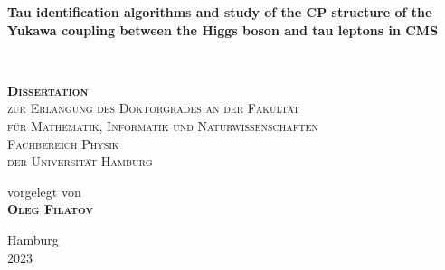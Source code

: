 
\begin{titlepage} %


\vspace{2cm}
    \centering

	\vspace{0.4cm}
    \parbox[t]{0.96\textwidth}{\rmfamily \setlength\parfillskip{0pt} \def\baselinestretch{1.1}\centering\Huge \bfseries Tau identification algorithms and study of the CP structure of the Yukawa coupling between the Higgs boson and tau leptons in CMS}\\
	\vspace{0.4cm}
    \vspace{2 cm} %
	
	
    \parbox[p]{0.95\textwidth}{\def\baselinestretch{1.4}\centering\scshape\textbf{\LARGE Dissertation} \\ {\large zur Erlangung des Doktorgrades an der Fakult{\"a}t\\ f{\"u}r Mathematik, Informatik und Naturwissenschaften \\ Fachbereich Physik \\ der Universit{\"a}t Hamburg} }
    
    \vspace{2 cm} %

    \parbox[b]{0.93\textwidth}{\def\baselinestretch{1.3}\centering\upshape \Large vorgelegt von \\ {\LARGE\scshape \bfseries Oleg Filatov } \\ %
    }
    
    \vspace{2 cm} %
    
    \parbox[b]{0.93\textwidth}{\def\baselinestretch{1.3}\centering\upshape\large Hamburg\\ 2023}

\end{titlepage}

